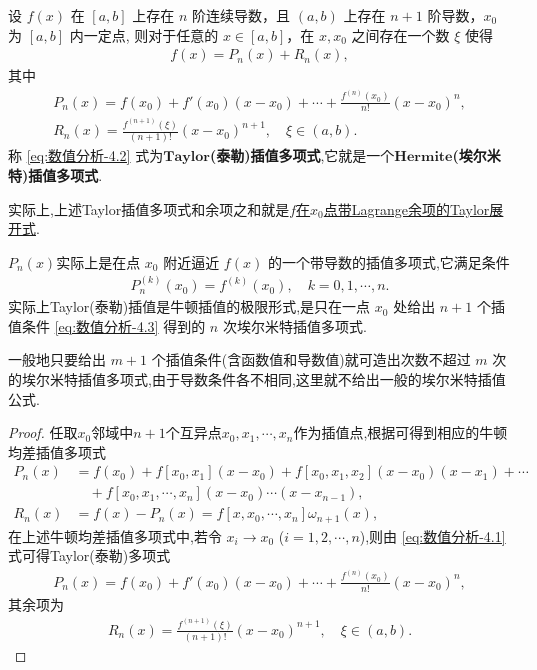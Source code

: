 \documentclass[../../main.tex]{subfiles}
\begin{document}
\begin{theorem}
设 $f(x)$ 在 $[a, b]$ 上存在 $n$ 阶连续导数，且 $(a, b)$ 上存在 $n + 1$ 阶导数，$x_0$ 为 $[a, b]$ 内一定点,
则对于任意的 $x \in [a, b]$，在 $x, x_0$ 之间存在一个数 $\xi$ 使得
\begin{align*}
f(x) = P_n(x)+R_n(x),
\end{align*}
其中
\begin{gather}
P_n(x) = f(x_0) + f'(x_0)(x - x_0) + \cdots + \frac{f^{(n)}(x_0)}{n!}(x - x_0)^n,\label{eq:数值分析-4.2}
\\
R_n(x) = \frac{f^{(n+1)}(\xi)}{(n+1)!}(x - x_0)^{n+1}, \quad \xi \in (a, b).\label{eq:数值分析-4.4}
\end{gather}
称 \eqref{eq:数值分析-4.2} 式为$\mathbf{Taylor}$\textbf{(泰勒)插值多项式},它就是一个$\mathbf{Hermite}$\textbf{(埃尔米特)插值多项式}.
\end{theorem}
\begin{remark}
实际上,上述Taylor插值多项式和余项之和就是\hyperref[Basis of Analytics-theorem:带各种余项的Taylor公式]{$f$在$x_0$点带Lagrange余项的Taylor展开式}.
\end{remark}
\begin{remark}
$P_n(x)$实际上是在点 $x_0$ 附近逼近 $f(x)$ 的一个带导数的插值多项式,它满足条件
\begin{align}
P_n^{(k)}(x_0) = f^{(k)}(x_0), \quad k = 0, 1, \cdots, n. \label{eq:数值分析-4.3}
\end{align}
实际上Taylor(泰勒)插值是牛顿插值的极限形式,是只在一点 $x_0$ 处给出 $n + 1$ 个插值条件 \eqref{eq:数值分析-4.3} 得到的 $n$ 次埃尔米特插值多项式.

一般地只要给出 $m + 1$ 个插值条件(含函数值和导数值)就可造出次数不超过 $m$ 次的埃尔米特插值多项式,由于导数条件各不相同,这里就不给出一般的埃尔米特插值公式.
\end{remark}
\begin{proof}
任取$x_0$邻域中$n+1$个互异点$x_0,x_1,\cdots,x_n$作为插值点,根据可得到相应的牛顿均差插值多项式
\begin{align*}
P_n(x) &= f(x_0) + f[x_0, x_1](x - x_0) + f[x_0, x_1, x_2](x - x_0)(x - x_1) + \cdots  \\
&\quad + f[x_0, x_1, \cdots, x_n](x - x_0) \cdots (x - x_{n-1}),\\
R_n(x) &= f(x) - P_n(x) = f[x, x_0, \cdots, x_n]\omega_{n+1}(x),
\end{align*}
在上述牛顿均差插值多项式中,若令 $x_i \to x_0$ ($i = 1, 2, \cdots, n$),则由 \eqref{eq:数值分析-4.1} 式可得Taylor(泰勒)多项式
\begin{align*}
P_n(x) = f(x_0) + f'(x_0)(x - x_0) + \cdots + \frac{f^{(n)}(x_0)}{n!}(x - x_0)^n, 
\end{align*}
其余项为
\begin{align*}
R_n(x) = \frac{f^{(n+1)}(\xi)}{(n+1)!}(x - x_0)^{n+1}, \quad \xi \in (a, b). 
\end{align*}
\end{proof}
\end{document}
